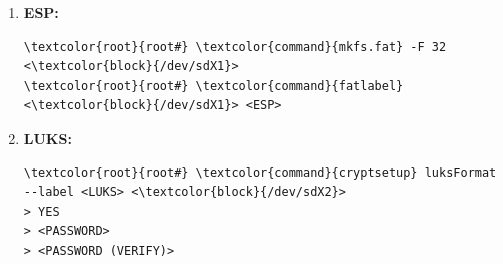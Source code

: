 \documentclass[10pt, a4paper, onecolumn, oneside, titlepage, openany]{book}
\begin{document}
\begin{enumerate}
\begin{enumerate}
        \item \textbf{ESP:}
\begin{Verbatim}[commandchars=\\\{\}]
\textcolor{root}{root#} \textcolor{command}{mkfs.fat} -F 32 <\textcolor{block}{/dev/sdX1}>
\textcolor{root}{root#} \textcolor{command}{fatlabel} <\textcolor{block}{/dev/sdX1}> <ESP>
\end{Verbatim}
        \item \textbf{LUKS:}
\begin{Verbatim}[commandchars=\\\{\}]
\textcolor{root}{root#} \textcolor{command}{cryptsetup} luksFormat --label <LUKS> <\textcolor{block}{/dev/sdX2}>
> YES
> <PASSWORD>
> <PASSWORD (VERIFY)>
\end{Verbatim}
    \end{enumerate}
\end{enumerate}
\end{document}
